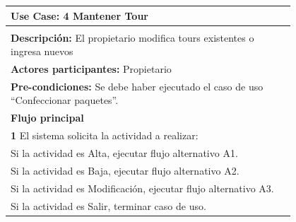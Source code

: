 \documentclass[12pt,a4paper,titlepage,oneside]{article}
\begin{document}
\begin{tabular}{| l | p{0.8\linewidth} |} \hline
	\multicolumn{2}{|p{0.8\linewidth}|}{\textbf{Use Case:} 4 Mantener Tour} \\\hline
	\multicolumn{2}{|c|}{} \\ \hline
	\multicolumn{2}{|p{0.8\linewidth}|}{\textbf{Descripci\'on:} El propietario modifica tours existentes o ingresa nuevos} \\ \hline
	\multicolumn{2}{|p{0.8\linewidth}|}{\textbf{Actores participantes:} Propietario} \\ \hline
	\multicolumn{2}{|p{0.8\linewidth}|}{\textbf{Pre-condiciones:} Se debe haber ejecutado el caso de uso “Confeccionar paquetes”.} \\ 			    \hline
		\multicolumn{2}{|p{0.8\linewidth}|}{\textbf{Flujo principal}} \\ \hline
	\multicolumn{2}{|p{0.8\linewidth}|}{\textbf{1}  El sistema solicita la actividad a realizar: } \\ \hline
	\multicolumn{2}{|p{0.8\linewidth}|}{  Si la actividad es Alta, ejecutar flujo alternativo A1.} \\ \hline
	\multicolumn{2}{|p{0.8\linewidth}|}{  Si la actividad es Baja, ejecutar flujo alternativo A2.} \\ \hline
		\multicolumn{2}{|p{0.8\linewidth}|}{  Si la actividad es Modificación, ejecutar flujo alternativo A3.} \\ \hline
		\multicolumn{2}{|p{0.8\linewidth}|}{  Si la actividad es Salir, terminar caso de uso.} \\ \hline


\end{tabular}
\end{document}
